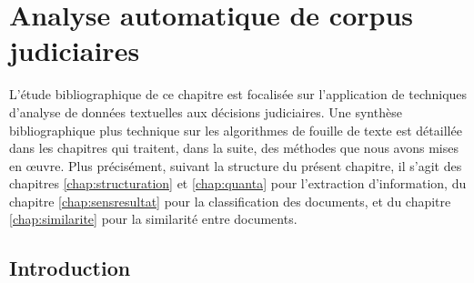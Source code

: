 \chapter{Analyse automatique de corpus judiciaires}
\label{chap:literature}


L'étude bibliographique de ce chapitre est focalisée sur l'application de techniques d'analyse de données textuelles aux décisions judiciaires. Une synthèse bibliographique plus technique sur les algorithmes de fouille de texte est détaillée dans les chapitres qui traitent, dans la suite, des méthodes que nous avons mises en \oe{}uvre. Plus précisément, suivant la structure du présent chapitre,  il s'agit des chapitres \ref{chap:structuration} et \ref{chap:quanta} pour l'extraction d'information, du chapitre \ref{chap:sensresultat} pour la classification des documents, et du chapitre \ref{chap:similarite} pour la similarité entre documents.

\section{Introduction}

